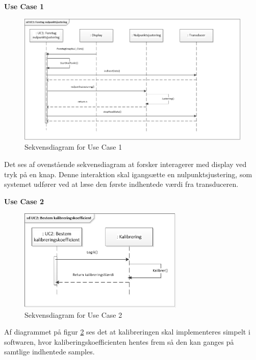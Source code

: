 \textbf{Use Case 1}
\begin{figure}[H]
	\centering
	\includegraphics[width=1.0\textwidth]{Figurer/UC1}
	\caption{Sekvensdiagram for Use Case 1}
	\label{fig:Sekvensdiagram_UC_1}
\end{figure}
Det ses af ovenstående sekvensdiagram at forsker interagerer med display ved tryk på en knap. Denne interaktion skal igangsætte en nulpunktsjustering, som systemet udfører ved at læse den første indhentede værdi fra transduceren. 

\textbf{Use Case 2}
\begin{figure}[H]
	\centering
	\includegraphics[width=0.7\textwidth]{Figurer/UC2}
	\caption{Sekvensdiagram for Use Case 2}
	\label{fig:Sekvensdiagram_UC_2}
\end{figure}
Af diagrammet på figur \ref{fig:Sekvensdiagram_UC_2} ses det at kalibreringen skal implementeres simpelt i softwaren, hvor kaliberingskoefficienten hentes frem så den kan ganges på samtlige indhentede samples.

